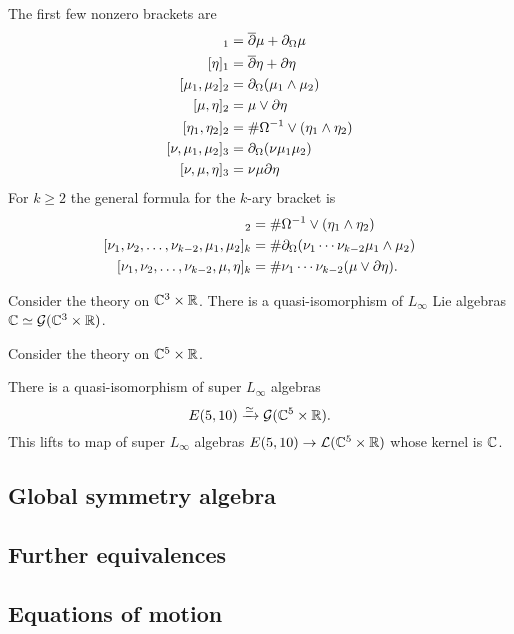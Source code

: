 \documentclass[11pt]{amsart}
\begin{document}
The first few nonzero brackets are
\begin{align*}
[\mu]_1 & = \dbar \mu + \div \mu \\
[\eta]_1 & = \dbar \eta + \del \eta \\ 
[\mu_1,\mu_2]_2 & = \div (\mu_1 \wedge \mu_2) \\
[\mu, \eta]_2 & = \mu \vee \del \eta \\
[\eta_1,\eta_2]_2 & = \# \Omega^{-1} \vee (\eta_1 \wedge \eta_2)  \\
[\nu, \mu_1,\mu_2]_3 & = \div(\nu \mu_1 \mu_2) \\
[\nu, \mu,\eta]_3 & = \nu \mu \del \eta
\end{align*}
For $k \geq 2$ the general formula for the $k$-ary bracket is 
\begin{align*}
[\eta_1,\eta_2]_2 & = \# \Omega^{-1} \vee (\eta_1 \wedge \eta_2)  \\
[\nu_1,\nu_2, \ldots, \nu_{k-2}, \mu_1,\mu_2]_{k} & = \# \div(\nu_1 \cdots \nu_{k-2} \mu_1 \wedge \mu_2) \\ 
[\nu_1,\nu_2, \ldots, \nu_{k-2}, \mu,\eta]_{k} & = \# \nu_1 \cdots \nu_{k-2} (\mu \vee \del \eta) .
\end{align*}

\parsec[]
Consider the theory on $\mathbb C^3 \times \mathbb R$. 
There is a quasi-isomorphism of $L_\infty$ Lie algebras $\mathbb C \simeq \mathcal G (\mathbb C^3 \times \mathbb R)$. 

\parsec[]
Consider the theory on $\mathbb C^5 \times \mathbb R$. 

\begin{prop}
There is a quasi-isomorphism of super $L_\infty$ algebras 
\[
E(5,10) \xrightarrow{\simeq} \mathcal G(\mathbb C^5 \times \mathbb R) .
\]
This lifts to map of super $L_\infty$ algebras $E(5,10) \to \mathcal L(\mathbb C^5 \times \mathbb R)$ whose kernel is $\mathbb C$.
\end{prop}

\subsection{Global symmetry algebra}

\subsection{Further equivalences}

\subsection{Equations of motion}
\end{document}

